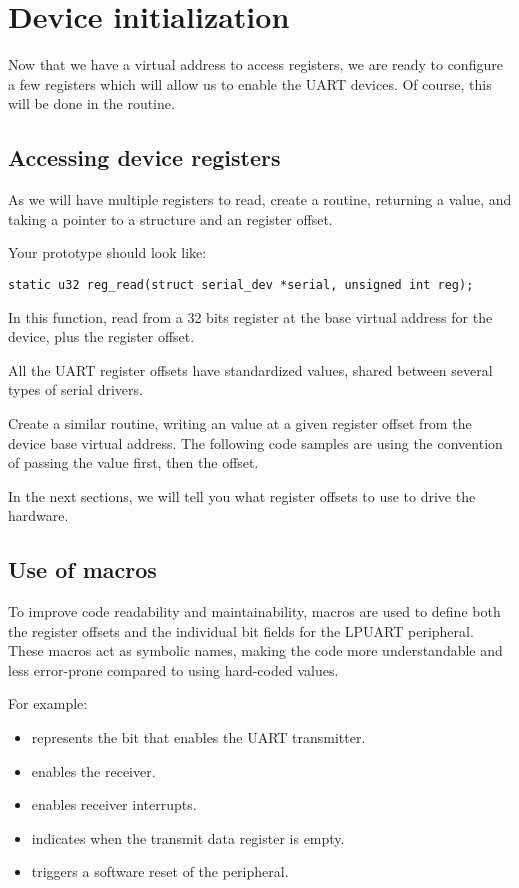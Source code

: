 \section{Device initialization}

Now that we have a virtual address to access registers, we are ready to
configure a few registers which will allow us to enable the UART
devices. Of course, this will be done in the  routine.

\subsection{Accessing device registers}

As we will have multiple registers to read, create a 
routine, returning a  value, and taking a 
pointer to a  structure and an 
register offset.

Your prototype should look like:
\begin{verbatim}
static u32 reg_read(struct serial_dev *serial, unsigned int reg);
\end{verbatim}

In this function, read from a 32 bits register at the base virtual
address for the device, plus the register offset.

All the UART register offsets have standardized values, shared between
several types of serial drivers.

Create a similar  routine, writing an 
value at a given register offset from the device base virtual address.
The following code samples are using
the  convention of passing the value first, then the
offset.

In the next sections, we will tell you what register offsets to use
to drive the hardware.


\subsection{Use of macros}

To improve code readability and maintainability, macros are used to define both the register offsets and the individual bit fields for the LPUART peripheral. These macros act as symbolic names, making the code more understandable and less error-prone compared to using hard-coded values.

For example:
\begin{itemize}
  \item {} represents the bit that enables the UART transmitter.
  \item {} enables the receiver.
  \item {} enables receiver interrupts.
  \item {} indicates when the transmit data register is empty.
  \item {} triggers a software reset of the peripheral.
\end{itemize}

